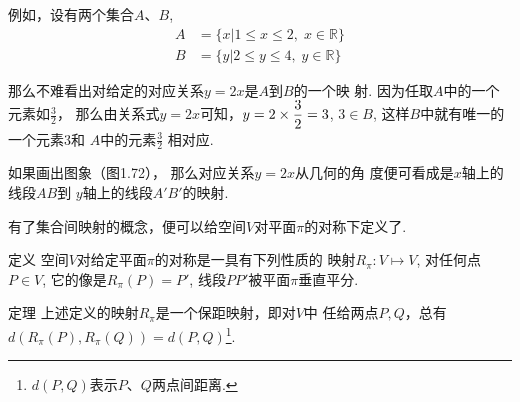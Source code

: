 例如，设有两个集合$A$、$B$, 
\[\begin{split}
  A&=\{x|1\le x\le 2,\; x\in\mathbb{R}\}\\
B&=\{y|2\le y\le 4,\; y\in\mathbb{R}\}
\end{split}\]

那么不难看出对给定的对应关系$y=2x$是$A$到$B$的一个映
射. 因为任取$A$中的一个元素如$\frac{3}{2}$，
那么由关系式$y=2x$可知，$y=2\times\dfrac{3}{2}=3$, $3\in B$, 这样$B$中就有唯一的一个元素3和
$A$中的元素$\frac{3}{2}$
相对应. 

\begin{figure}[htp]
  \centering
{}
  \caption{}
\end{figure}

如果画出图象（图1.72），
那么对应关系$y=2x$从几何的角
度便可看成是$x$轴上的线段$AB$到
$y$轴上的线段$A'B'$的映射. 

有了集合间映射的概念，便可以给空间$V$对平面$\pi$的对称下定义了. 

\begin{blk}
  {定义} 空间$V$对给定平面$\pi$的对称是一具有下列性质的
映射$R_{\pi}:V\mapsto V$, 对任何点$P\in V$, 它的像是$R_{\pi}(P)=P'$, 
线段$PP'$被平面$\pi$垂直平分. 
\end{blk}

\begin{blk}
  {定理} 上述定义的映射$R_{\pi}$是一个保距映射，即对$V$中
任给两点$P,Q$，总有$d(R_{\pi}(P),R_{\pi}(Q))=d(P,Q)$\footnote{$d(P,Q)$表示$P$、$Q$两点间距离. }.
\end{blk}

